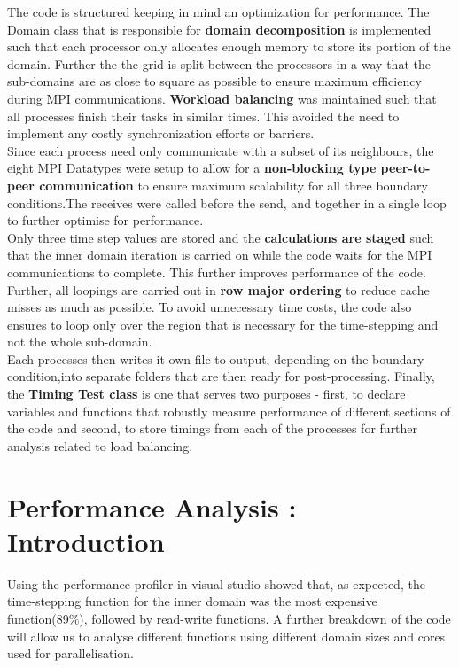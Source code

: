 \documentclass[twoside,twocolumn]{article}
\begin{document}
The code is structured keeping in mind an optimization for performance. The Domain class that is responsible for \textbf{domain decomposition} is implemented such that each processor only allocates enough memory to store its portion of the domain. Further the the grid is split between the processors in a way that the sub-domains are as close to square as possible to ensure maximum efficiency during MPI communications. \textbf{Workload balancing} was maintained such that all processes finish their tasks in similar times. This avoided the need to implement any costly synchronization efforts or barriers. \\
Since each process need only communicate with a subset of its neighbours, the eight MPI Datatypes were setup to allow for a \textbf{non-blocking type peer-to-peer communication} to ensure maximum scalability for all three boundary conditions.The receives were called before the send, and together in a single loop to further optimise for performance.\\
Only three time step values are stored and the \textbf{calculations are staged} such that the inner domain iteration is carried on while the code waits for the MPI communications to complete. This further improves performance of the code. Further, all loopings are carried out in \textbf{row major ordering} to reduce cache misses as much as possible. To avoid unnecessary time costs, the code also ensures to loop only over the region that is necessary for the time-stepping and not the whole sub-domain.\\
Each processes then writes it own file to output, depending on the boundary condition,into separate folders that are then ready for post-processing. Finally, the \textbf{Timing Test class} is one that serves two purposes  - first, to declare variables and functions that robustly measure performance of different sections of the code and second, to store timings from each of the processes for further analysis related to load balancing.
\vspace{-4mm}
\section{Performance Analysis : Introduction}
Using the performance profiler in visual studio showed that, as expected, the time-stepping function for the inner domain was the most expensive function(89\%), followed by read-write functions. A further breakdown of the code will allow us to analyse different functions using different domain sizes and cores used for parallelisation.\\
\end{document}
